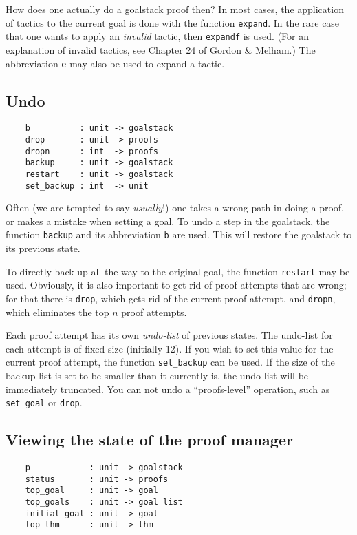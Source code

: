 How does one actually do a goalstack proof then? In most cases, the
application of tactics to the current goal is done with the function
\verb+expand+. In the rare case that one wants to apply an
{\it invalid\/} tactic, then \verb+expandf+ is used. (For an
explanation of invalid tactics, see Chapter 24 of Gordon \& Melham.) The
abbreviation \verb+e+ may also be used to expand a tactic.


\subsection{Undo}

\begin{verbatim}
    b          : unit -> goalstack
    drop       : unit -> proofs
    dropn      : int  -> proofs
    backup     : unit -> goalstack
    restart    : unit -> goalstack
    set_backup : int  -> unit
\end{verbatim}

Often (we are tempted to say {\it usually}!) one takes a wrong path
in doing a proof, or makes a mistake when setting a goal. To undo a step
in the goalstack, the function \verb+backup+ and its abbreviation
\verb+b+ are used. This will restore the goalstack to its previous
state.


To directly back up all the way to the original goal, the function
\verb+restart+ may be used. Obviously, it is also important to get
rid of proof attempts that are wrong; for that there is \verb+drop+,
which gets rid of the current proof attempt, and \verb+dropn+, which
eliminates the top $n$ proof attempts.


Each proof attempt has its own {\it undo-list\/} of previous
states. The undo-list for each attempt is of fixed size (initially
12). If you wish to set this value for the current proof attempt, the
function \verb+set_backup+ can be used. If the size of the backup
list is set to be smaller than it currently is, the undo list will be
immediately truncated. You can not undo a ``proofs-level'' operation, such
as \verb+set_goal+ or \verb+drop+.

\subsection{Viewing the state of the proof manager}

\begin{verbatim}
    p            : unit -> goalstack
    status       : unit -> proofs
    top_goal     : unit -> goal
    top_goals    : unit -> goal list
    initial_goal : unit -> goal
    top_thm      : unit -> thm
\end{verbatim}

